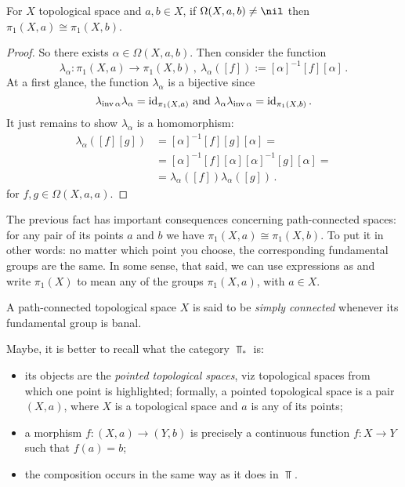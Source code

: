 \begin{proposition}
For \(X\) topological space and \(a, b \in X\), if \(\Omega(X, a, b) \ne \nil\) then \(\pi_1(X, a) \cong \pi_1(X, b)\).
\end{proposition}

\begin{proof}
So there exists \(\alpha \in \Omega(X, a, b)\). Then consider the function
\[\lambda_\alpha : \pi_1(X, a) \to \pi_1(X, b)\,, \ \lambda_\alpha([f]) := {[\alpha]}^{-1}[f][\alpha]\,.\]
At a first glance, the function \(\lambda_\alpha\) is a bijective since
\[\lambda_{\operatorname{inv} \alpha} \lambda_\alpha = \text{id}_{\pi_1(X, a)} \text{ and } \lambda_\alpha \lambda_{\operatorname{inv} \alpha} = \text{id}_{\pi_1(X, b)}\,.\]
It just remains to show \(\lambda_\alpha\) is a homomorphism:
\begin{align*}
\lambda_\alpha([f][g]) &= {[\alpha]}^{-1}[f][g][\alpha] = \\
&= {[\alpha]}^{-1}[f][\alpha]{[\alpha]}^{-1}[g][\alpha] = \\
&= \lambda_\alpha([f])\lambda_\alpha([g]) \,.
\end{align*}
for \(f, g \in \Omega(X, a, a)\).
\end{proof}

The previous fact has important consequences concerning path-connected spaces: for any pair of its points \(a\) and \(b\) we have \(\pi_1(X, a) \cong \pi_1(X, b)\). To put it in other words: no matter which point you choose, the corresponding fundamental groups are the same. In some sense, that said, we can use expressions as  and write \(\pi_1(X)\) to mean any of the groups \(\pi_1(X, a)\), with \(a \in X\).


\begin{definition}
A path-connected topological space \(X\) is said to be {\em simply connected} whenever its fundamental group is banal.
\end{definition}

Maybe, it is better to recall what the category \(\Top_\ast\) is:
\begin{itemize}
\item its objects are the {\em pointed topological spaces}, viz topological spaces from which one point is highlighted; formally, a pointed topological space is a pair \((X, a)\), where \(X\) is a topological space and \(a\) is any of its points;
\item a morphism \(f : (X, a) \to (Y, b)\) is precisely a continuous function \(f : X \to Y\) such that \(f(a) = b\);
\item the composition occurs in the same way as it does in \(\Top\).
\end{itemize}

